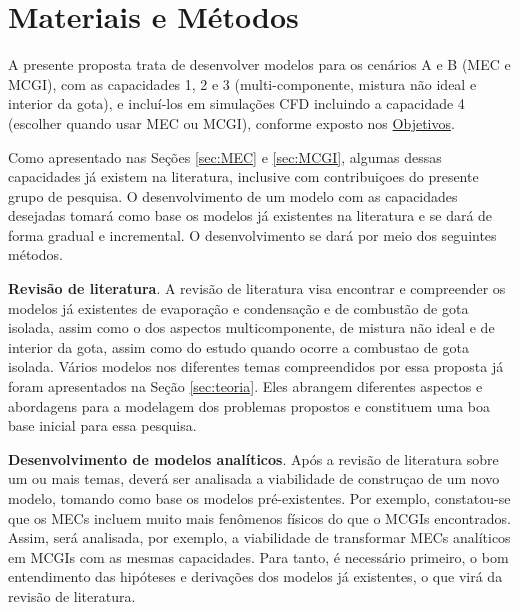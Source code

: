 

\section{Materiais e Métodos} \label{sec:metod}

A presente proposta trata de desenvolver modelos para os cenários A e B (MEC e MCGI), com as capacidades 1, 2 e 3 (multi-componente, mistura não ideal e interior da gota), e incluí-los em simulações CFD incluindo a capacidade 4 (escolher quando usar MEC ou MCGI), conforme exposto nos \hyperref[sec:objetivos]{Objetivos}.

Como apresentado nas Seções \ref{sec:MEC} e \ref{sec:MCGI}, algumas dessas capacidades já existem na literatura, inclusive com contribuiçoes do presente grupo de pesquisa.
O desenvolvimento de um modelo com as capacidades desejadas tomará como base os modelos já existentes na literatura e se dará de forma gradual e incremental.
O desenvolvimento se dará por meio dos seguintes métodos.

\textbf{Revisão de literatura}. 
A revisão de literatura visa encontrar e compreender os modelos já  existentes de evaporação e condensação e de combustão de gota isolada, assim como o dos aspectos multicomponente, de mistura não ideal e de interior da gota, assim como do estudo quando ocorre a combustao de gota isolada.
Vários modelos nos diferentes temas compreendidos por essa proposta já foram apresentados na Seção \ref{sec:teoria}.
Eles abrangem diferentes aspectos e abordagens para a modelagem dos problemas propostos e constituem uma boa base inicial para essa pesquisa. 

\textbf{Desenvolvimento de modelos analíticos}.
Após a revisão de literatura sobre um ou mais temas, deverá ser analisada a viabilidade de construçao de um novo modelo, tomando como base os modelos pré-existentes.
Por exemplo, constatou-se que os MECs incluem muito mais fenômenos físicos do que o MCGIs encontrados. 
Assim, será analisada, por exemplo, a viabilidade de transformar MECs analíticos em MCGIs com as mesmas capacidades.
Para tanto, é necessário primeiro, o bom entendimento das hipóteses e derivações dos modelos já existentes, o que virá da revisão de literatura.   

